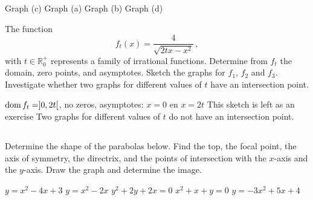 \begin{Answer}\phantom{}
    \begin{multicols}{2}
    
    	\Question Graph (c)
    	\Question Graph (a)
    	\Question Graph (b)
    	\Question Graph (d)
    \EndCurrentQuestion
    \end{multicols}
\end{Answer}
 
\ifanalysis
 \begin{Exercise}[difficulty=1] The function 
 \[ f_t(x) = \dfrac{4}{\sqrt{2tx-x^2}}\,, \]
 with $t \in \mathbb{R}_0^+$ represents a family of irrational functions.
     \Question Determine from $f_t$ the domain, zero points, and asymptotes. 
     \Question Sketch the graphs for $f_1$, $f_2$ and $f_3$.
     \Question Investigate whether two graphs for different values of $t$ have an intersection point.

\end{Exercise}

\begin{Answer}\phantom{}
    
         \Question $\text{dom}{\,} f_t= ]0,2t[$, no zeros, asymptotes: $x=0$ en $x=2t$
         \Question This sketch is left as an exercise
         \Question Two graphs for different values of $t$ do not have an intersection point.
\end{Answer}

\fi

\subsection*{}

\begin{Exercise} Determine the shape of the parabolas below. Find the top, the focal point, the axis of symmetry, the directrix, and the points of intersection with the $x$-axis and the $y$-axis. Draw the graph and determine the image. 
	\begin{multicols}{2}
	    \Question[difficulty = 1] $y=x^2-4x+3$ 
	    \Question[difficulty = 1] $y=x^2-2x$  
	    \Question[difficulty = 1] $y^2+2y+2x=0$ %
	    \Question[difficulty = 1] $x^2+x+y=0$ 
	    \ifanalysis\Question[difficulty = 1]\fi\ifcalculus\Question[difficulty = 2]\fi $y=-3x^2+5x+4$ 
	    \EndCurrentQuestion
	\end{multicols}

\end{Exercise}

